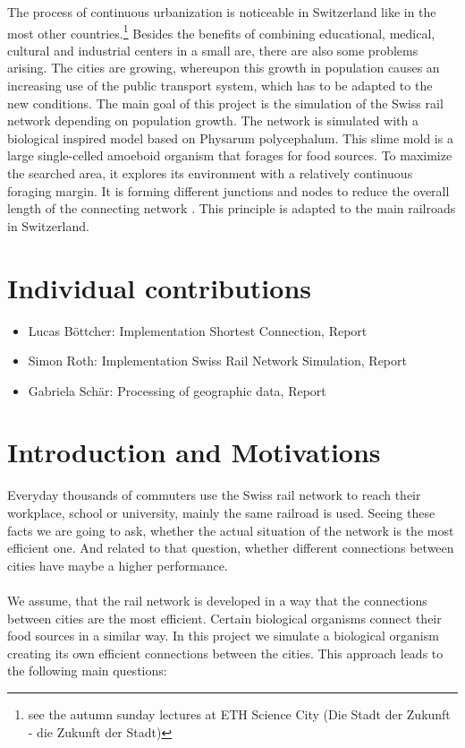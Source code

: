 \documentclass[11pt]{scrartcl}
\begin{document}
The process of continuous urbanization is noticeable in Switzerland like in the most other countries.\footnote[1]{see the autumn sunday lectures at ETH Science City (Die Stadt der Zukunft - die Zukunft der Stadt)} Besides the benefits of combining educational, medical, cultural and industrial centers in a small are, there are also some problems arising. The cities are growing, whereupon this growth in population causes an increasing use of the public transport system, which has to be adapted to the new conditions. The main goal of this project is the simulation of the Swiss rail network depending on population growth. The network is simulated with a biological inspired model based on Physarum polycephalum. This slime mold is a large single-celled amoeboid organism that forages for food sources. To maximize the searched area, it explores its environment with a relatively continuous foraging margin. It is forming different junctions and nodes to reduce the overall length of the connecting network \cite{network_tokyo}. This principle is adapted to the main railroads in Switzerland. 


\section{Individual contributions}
\begin{itemize}
  \item Lucas Böttcher: Implementation Shortest Connection, Report
  \item Simon Roth: Implementation Swiss Rail Network Simulation, Report
  \item Gabriela Schär: Processing of geographic data, Report
\end{itemize}


\section{Introduction and Motivations}
\label{sec:introduction}
Everyday thousands of commuters use the Swiss rail network to reach their workplace, school or university, mainly the same railroad is used. Seeing these facts we are going to ask, whether the actual situation of the network is the most efficient one. And related to that question, whether different connections between cities have maybe a higher performance.\\
\\
We assume, that the rail network is developed in a way that the connections between cities are the most efficient. Certain biological organisms connect their food sources in a similar way. In this project we simulate a biological organism creating its own efficient connections between the cities. This approach leads to the following main questions:
\end{document}
